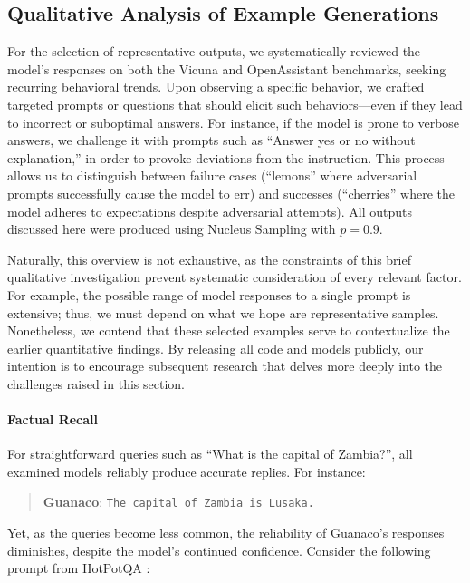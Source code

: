 \subsection{Qualitative Analysis of Example Generations}
\label{ssec:examples}

For the selection of representative outputs, we systematically reviewed the model's responses on both the Vicuna and OpenAssistant benchmarks, seeking recurring behavioral trends. Upon observing a specific behavior, we crafted targeted prompts or questions that should elicit such behaviors—even if they lead to incorrect or suboptimal answers. For instance, if the model is prone to verbose answers, we challenge it with prompts such as ``Answer yes or no without explanation,'' in order to provoke deviations from the instruction. This process allows us to distinguish between failure cases (``lemons'' where adversarial prompts successfully cause the model to err) and successes (``cherries'' where the model adheres to expectations despite adversarial attempts). All outputs discussed here were produced using Nucleus Sampling \cite{holtzmancurious} with $p=0.9$.

Naturally, this overview is not exhaustive, as the constraints of this brief qualitative investigation prevent systematic consideration of every relevant factor. For example, the possible range of model responses to a single prompt is extensive; thus, we must depend on what we hope are representative samples. Nonetheless, we contend that these selected examples serve to contextualize the earlier quantitative findings. By releasing all code and models publicly, our intention is to encourage subsequent research that delves more deeply into the challenges raised in this section.
\paragraph{Factual Recall} For straightforward queries such as ``What is the capital of Zambia?'', all examined models reliably produce accurate replies. For instance:

\begin{quote} 
    \textbf{Guanaco}:
    \texttt{The capital of Zambia is Lusaka.}
\end{quote}

Yet, as the queries become less common, the reliability of {Guanaco}'s responses diminishes, despite the model’s continued confidence. Consider the following prompt from HotPotQA \citep{yang2018hotpotqa}:

